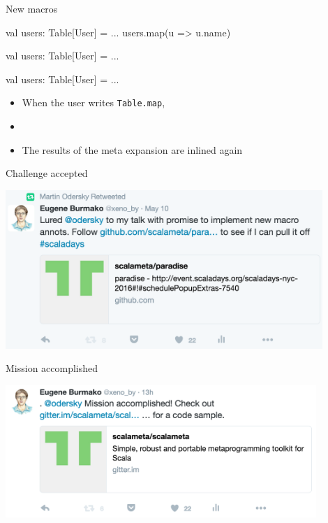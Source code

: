 \documentclass[svgnames,dvipsnames,hyperref={bookmarks=false},usepdftitle=false]{beamer}
\begin{document}
\begin{frame}[fragile]{New macros}
\begin{semiverbatim}
val users: Table[User] = ...
users.map(u => u.name)

                          \arrowdown

val users: Table[User] = ...

                          \arrowdown

val users: Table[User] = ...

\end{semiverbatim}

\begin{itemize}
\item When the user writes \texttt{Table.map}, 
\item {}
\item The results of the meta expansion are inlined again
\end{itemize}
\end{frame}


\begin{frame}{Challenge accepted}
\vskip20pt
\begin{center}
\includegraphics[height=6cm]{challenge-accepted.png}
\end{center}
\end{frame}

\begin{frame}{Mission accomplished}
\vskip20pt
\begin{center}
\includegraphics[height=5cm]{mission-accomplished.png}
\end{center}
\end{frame}
\end{document}
